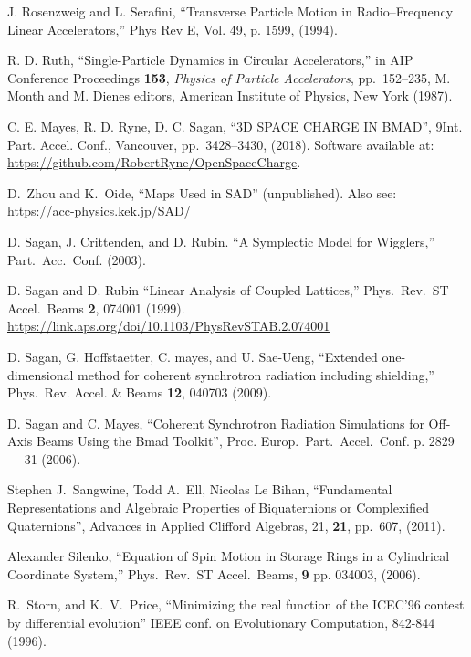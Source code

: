 \begin{thebibliography}{XXXXXXX99}
J. Rosenzweig and L. Serafini, ``Transverse Particle Motion in
Radio--Frequency Linear Accelerators,'' Phys Rev E, Vol. 49, p. 1599,
(1994).

R. D. Ruth, ``Single-Particle Dynamics in
Circular Accelerators,'' in AIP Conference Proceedings {\bf 153}, {\em
Physics of Particle Accelerators}, pp.~152--235, M. Month and M. Dienes editors,
American Institute of Physics, New York (1987).

C. E. Mayes, R. D. Ryne, D. C. Sagan, 
``3D SPACE CHARGE IN BMAD'',
9\Th Int. Part. Accel. Conf., Vancouver, pp.~3428--3430, (2018).
Software available at: \url{https://github.com/RobertRyne/OpenSpaceCharge}.

D.~Zhou and K.~Oide, ``Maps Used in SAD'' (unpublished).
Also see:
\hfill\break
\hspace*{0.3in} \url{https://acc-physics.kek.jp/SAD/}

D. Sagan, J. Crittenden, and D. Rubin.
``A Symplectic Model for Wigglers,'' Part.\ Acc.\ Conf. (2003).

D. Sagan and D. Rubin ``Linear Analysis of Coupled Lattices,''
Phys.\ Rev.\ ST Accel.\ Beams {\bf 2}, 074001 (1999).
\hfill\break
\hspace*{20pt} 
\url{https://link.aps.org/doi/10.1103/PhysRevSTAB.2.074001}

D. Sagan, G. Hoffstaetter, C. mayes, and U. Sae-Ueng,
``Extended one-dimensional method for coherent synchrotron radiation including shielding,''
Phys.\ Rev. Accel. \& Beams {\bf 12}, 040703 (2009).

D. Sagan and C. Mayes, 
``Coherent Synchrotron Radiation Simulations for Off-Axis Beams Using the Bmad Toolkit'',
Proc. Europ.\ Part.\ Accel.\ Conf. p. 2829 --- 31 (2006).

Stephen J.\ Sangwine, Todd A.\ Ell, Nicolas Le Bihan, 
``Fundamental Representations and Algebraic Properties of Biquaternions or Complexified Quaternions'',
Advances in Applied Clifford Algebras, 21, {\bf 21}, pp.~607, (2011).

Alexander Silenko, 
``Equation of Spin Motion in Storage Rings in a Cylindrical Coordinate System,''
Phys.\ Rev.\ ST Accel.\ Beams, {\bf 9} pp. 034003, (2006).


R.~Storn, and K.~V.~Price, ``Minimizing the real function of the
ICEC'96 contest by differential evolution'' IEEE conf. on Evolutionary
Computation, 842-844 (1996).


\end{thebibliography}
